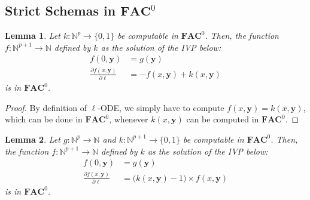 \documentclass[11pt, oneside]{article}
\newcommand{\Nat}{\mathbb{N}}
\newcommand{\AC}{\mathbf{FAC}}
\newcommand{\tu}[1]{\mathbf{#1}}
\newtheorem{lemma}{Lemma}
\theoremstyle{definition}
\begin{document}
\begin{toappendix}
%
\subsection{Strict Schemas in $\AC^0$}\label{appendix:AC0}





\begin{lemma}
    Let $k: \Nat^{p} \to \{0, 1\}$ be computable in $\AC^0$. 
    Then, the function $f: \Nat^{p+1} \to \Nat$ defined by $k$ as the solution of the IVP below:
        \begin{align*}
        f(0, \tu y) &= g(\tu y) \\
        \frac{\partial f(x, \tu y)}{\partial \ell} &= - f(x, \tu y) + k(x, \tu y)
        \end{align*}
    is in $\AC^0$.
\end{lemma}
\begin{proof}
    By definition of $\ell$-ODE, we simply have to compute $f(x, \tu y) = k(x, \tu y)$, which can be done in $\AC^0$, whenever $k(x, \tu y)$ can be computed in $\AC^0$.
\end{proof}



\begin{lemma}\label{lemma:ODEzero}
Let $g:\Nat^p \to \Nat$ and $k:\Nat^{p+1}\to \{0,1\}$ be computable in $\AC^0$.
Then, the function $f:\Nat^{p+1}\to \Nat$ defined by $k$ as the solution of the IVP below:
    \begin{align*}
        f(0, \tu y) &= g(\tu y) \\
        \frac{\partial f(x, \tu y)}{\partial \ell} &= \big(k(x, \tu y) -1\big) \times f(x, \tu y)
    \end{align*}
is in $\AC^0$.
\end{lemma}



\end{toappendix}
\end{document}
